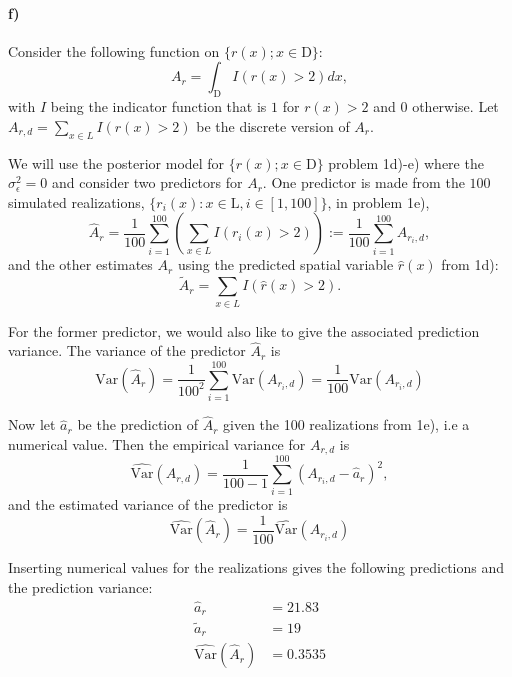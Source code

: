 \paragraph{f)}
Consider the following function on $\{r(x); x \in \text{D}\}$:
\begin{equation}
    A_r = \int_{\text{D}} I(r(x)>2)dx,
\end{equation}
with $I$ being the indicator function that is $1$ for $r(x)>2$ and $0$ otherwise. Let $A_{r,d} = \sum_{x \in L} I(r(x)>2)$ be the discrete version of $A_r$.

We will use the posterior model for $\{r(x); x \in \text{D}\}$ problem 1d)-e) where the $\sigma^2_{\epsilon} = 0$ and consider two predictors for $A_r$. One predictor is made from the $100$ simulated realizations, $\{r_i(x): x \in \text{L}, i \in [1,100]\}$, in problem 1e),
\begin{equation*}
    \hat{A}_r = \frac{1}{100}\sum_{i=1}^{100} \left(\sum_{x \in L} I(r_i(x)>2)\right) := \frac{1}{100}\sum_{i=1}^{100} A_{r_i,d},
\end{equation*}
and the other estimates $A_r$ using the predicted spatial variable $\hat{r}(x)$ from 1d):
\begin{equation*}
    \tilde{A}_r = \sum_{x \in L} I(\hat{r}(x)>2).
\end{equation*}

For the former predictor, we would also like to give the associated prediction variance. The variance of the predictor $\hat{A}_r$ is
\begin{equation*}
    \text{Var}(\hat{A}_{r}) = \frac{1}{100^2}\sum_{i=1}^{100}\text{Var}(A_{r_i,d}) = \frac{1}{100}\text{Var}(A_{r_i,d})
\end{equation*}

Now let $\hat{a}_r$ be the prediction of $\hat{A}_r$ given the 100 realizations from 1e), i.e a numerical value. Then the empirical variance for $A_{r,d}$ is 
\begin{equation*}
    \hat{\text{Var}}(A_{r,d}) = \frac{1}{100-1} \sum_{i=1}^{100}  (A_{r_i,d}-\hat{a}_r)^2, 
\end{equation*}
and the estimated variance of the predictor is 
\begin{equation*}
    \hat{\text{Var}}(\hat{A}_{r}) = \frac{1}{100}\hat{\text{Var}}(A_{r_i,d})
\end{equation*}

Inserting numerical values for the realizations gives the following predictions and the prediction variance:
\begin{align*}
    \hat{a}_r & = 21.83\\
    \tilde{a}_r & = 19\\
    \hat{\text{Var}}(\hat{A}_{r}) & = 0.3535\\
\end{align*}

